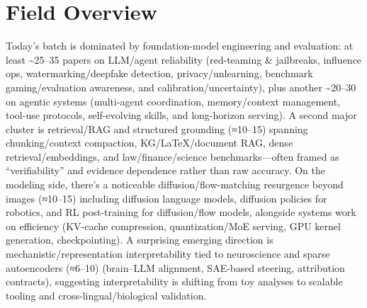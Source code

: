 \documentclass[12pt,letterpaper]{article}
\begin{document}
\medskip



\section*{Field Overview}
{\footnotesize Today's batch is dominated by foundation-model engineering and evaluation: at least \textasciitilde{}25--35 papers on LLM/agent reliability (red-teaming \& jailbreaks, influence ops, watermarking/deepfake detection, privacy/unlearning, benchmark gaming/evaluation awareness, and calibration/uncertainty), plus another \textasciitilde{}20--30 on agentic systems (multi-agent coordination, memory/context management, tool-use protocols, self-evolving skills, and long-horizon serving). A second major cluster is retrieval/RAG and structured grounding (≈10--15) spanning chunking/context compaction, KG/LaTeX/document RAG, dense retrieval/embeddings, and law/finance/science benchmarks---often framed as ``verifiability'' and evidence dependence rather than raw accuracy. On the modeling side, there's a noticeable diffusion/flow-matching resurgence beyond images (≈10--15) including diffusion language models, diffusion policies for robotics, and RL post-training for diffusion/flow models, alongside systems work on efficiency (KV-cache compression, quantization/MoE serving, GPU kernel generation, checkpointing). A surprising emerging direction is mechanistic/representation interpretability tied to neuroscience and sparse autoencoders (≈6--10) (brain--LLM alignment, SAE-based steering, attribution contracts), suggesting interpretability is shifting from toy analyses to scalable tooling and cross-lingual/biological validation.}
\end{document}
